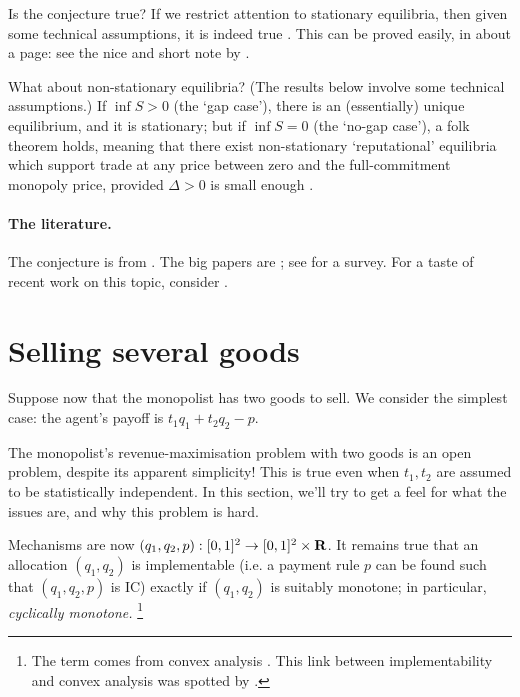 Is the conjecture true?
If we restrict attention to stationary equilibria,
then given some technical assumptions,
it is indeed true \parencite{GulSonnenscheinWilson1986}.
This can be proved easily, in about a page: see the nice and short note by \textcite{Liu2015}.

What about non-stationary equilibria?
(The results below involve some technical assumptions.)
If $\inf S > 0$ (the `gap case'), there is an (essentially) unique equilibrium, and it is stationary;
but if $\inf S = 0$ (the `no-gap case'), a folk theorem holds, 
meaning that there exist non-stationary `reputational' equilibria
which support trade at any price between zero and the full-commitment monopoly price, provided $\Delta>0$ is small enough \parencite{GulSonnenscheinWilson1986,AusubelDeneckere1989}.


\paragraph{The literature.}
The conjecture is from \textcite{Coase1972}.
The big papers are \textcite{FudenbergLevineTirole1985,GulSonnenscheinWilson1986,AusubelDeneckere1989};
see \textcite{AusubelCramtonDeneckere2002} for a survey.
For a taste of recent work on this topic, consider \textcite{DovalSkreta2021}.



\section{Selling several goods}
\label{sec:ch1:multi-d}

Suppose now that the monopolist has two goods to sell.
We consider the simplest case: the agent's payoff is $t_1 q_1 + t_2 q_2 - p$.

The monopolist's revenue-maximisation problem with two goods is an open problem, despite its apparent simplicity!
This is true even when $t_1,t_2$ are assumed to be statistically independent.
In this section, we'll try to get a feel for what the issues are, and why this problem is hard.

Mechanisms are now $(q_1,q_2,p) : [0,1]^2 \to [0,1]^2 \times \mathbf{R}$.
It remains true that an allocation $(q_1,q_2)$ is implementable (i.e. a payment rule $p$ can be found such that $(q_1,q_2,p)$ is IC)
exactly if $(q_1,q_2)$ is suitably monotone;
in particular, \emph{cyclically monotone.}%
	\footnote{The term comes from convex analysis \parencite[see][]{Rockafellar1970}. This link between implementability and convex analysis was spotted by \textcite{Rochet1987}.}

